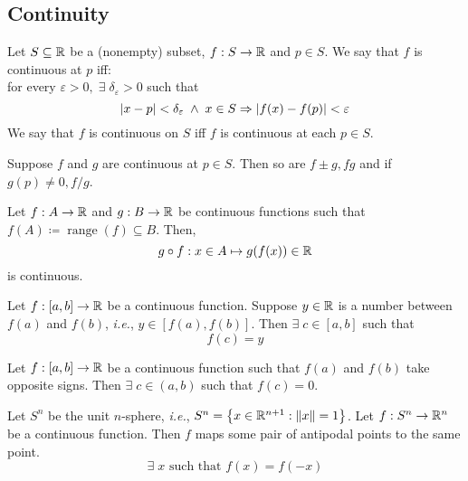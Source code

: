 \documentclass[12pt]{article}
\begin{document}
\subsection{Continuity}

\begin{defn} \label{defn:cont}
    Let $S \subseteq \mathbb{R}$ be a (nonempty) subset, $f: S \to \mathbb{R}$ and $p \in S$. We say that $f$ is continuous at $p$ iff: \\
    for every $\varepsilon > 0, \;\exists\; \delta_{\varepsilon} > 0$ such that \[
        \abs{x - p} < \delta_{\varepsilon} \;\land\; x \in S \implies \abs{f(x) - f(p)} < \varepsilon
    \] We say that $f$ is continuous on $S$ iff $f$ is continuous at each $p \in S$.
\end{defn}

\begin{thm} \label{thm:cont:laws}
    Suppose $f$ and $g$ are continuous at $p \in S$. Then so are $f \pm g, fg$ and if $g(p) \neq 0, f/g$.
\end{thm}

\begin{thm} \label{thm:cont:composition}
    Let $f: A \to \mathbb{R}$ and $g: B \to \mathbb{R}$ be continuous functions such that $f(A) \coloneqq \mathop{range}(f) \subseteq B$. Then, \[
        g \circ f : x \in A \mapsto g(f(x)) \in \mathbb{R}
    \] is continuous.
\end{thm}

\begin{thm} \label{thm:cont:IVT}
    Let $f: [a, b] \to \mathbb{R}$ be a continuous function. Suppose $y \in \mathbb{R}$ is a number between $f(a)$ and $f(b)$, \textit{i.e.}, $y \in [f(a), f(b)]$. Then $\exists\; c \in [a, b]$ such that \[
        f(c) = y
    \]
\end{thm}

\begin{cor} \label{thm:cont:Bolzano}
    Let $f : [a, b] \to \mathbb{R}$ be a continuous function such that $f(a)$ and $f(b)$ take opposite signs. Then $\exists\; c \in (a, b)$ such that $f(c) = 0$.
\end{cor}

\begin{thm} \label{thm:cont:Borsuk-Ulam}
    Let $S^{n}$ be the unit $n$-sphere, \textit{i.e.}, $S^{n} = \set{x \in \R^{n+1} : \norm{x} = 1}$. Let $f: S^{n} \to \mathbb{R}^{n}$ be a continuous function.
    Then $f$ maps some pair of antipodal points to the same point. \[
        \exists\; x \text{ such that } f(x) = f(-x)
    \]
\end{thm}
\end{document}
